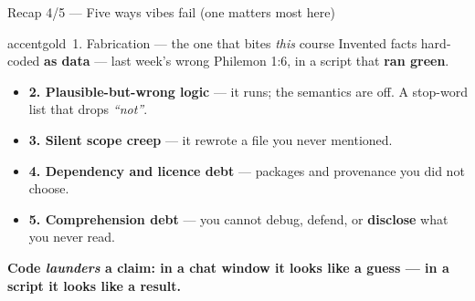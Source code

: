 \begin{frame}{Recap 4/5 --- Five ways vibes fail (one matters most here)}
  \begin{featbox}{accentgold}{\faGhost\ 1. Fabrication --- the one that bites \emph{this} course}
    \small
    Invented facts hard-coded \textbf{as data} --- last week's wrong Philemon 1:6,
    in a script that \textbf{ran green}.
  \end{featbox}
  \vspace{3pt}
  {\small
  \begin{itemize}\setlength{\itemsep}{2pt}
    \item \textbf{2. Plausible-but-wrong logic} --- it runs; the semantics are off.
          A stop-word list that drops \emph{``not''}.
    \item \textbf{3. Silent scope creep} --- it rewrote a file you never mentioned.
    \item \textbf{4. Dependency and licence debt} --- packages and provenance you did not choose.
    \item \textbf{5. Comprehension debt} --- you cannot debug, defend, or
          \textbf{disclose} what you never read.
  \end{itemize}}
  \vspace{4pt}
  \begin{center}\small\color{labnavy}\bfseries
    Code \emph{launders} a claim: in a chat window it looks like a guess ---
    in a script it looks like a \textbf{result}.\end{center}
\end{frame}

